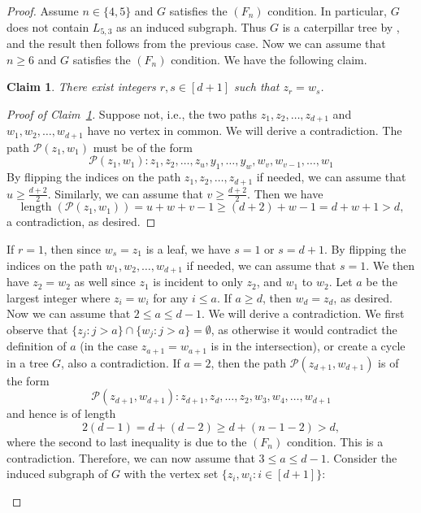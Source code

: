 \documentclass{amsart}
\newtheorem{claim}[theorem]{Claim}
\theoremstyle{remark}
\theoremstyle{definition}
\DeclareMathOperator{\length}{length}
\begin{document}
\begin{proof}
		Assume $n\in \{4,5\}$ and $G$ satisfies the $(F_n)$ condition. In particular, $G$ does not contain $L_{5,3}$ as an induced subgraph. Thus $G$ is a caterpillar tree by \cite[Theorem~1]{HS71}, and the result then follows from the previous case. Now we can assume that $n\geq 6$ and $G$ satisfies the $(F_n)$ condition. We have the following claim.
		\begin{claim}\label{clm:z-w-intersect}
			There exist integers $r,s\in [d+1]$ such that $z_r=w_s$.
		\end{claim}
		\begin{proof}[Proof of Claim~\ref{clm:z-w-intersect}]
			Suppose not, i.e., the two paths $z_1,z_2,\dots, z_{d+1}$ and $w_1,w_2,\dots, w_{d+1}$ have no vertex in common. We will derive a contradiction. The path $\mathcal{P}(z_1,w_1)$ must be of the form
			\[
			\mathcal{P}(z_1,w_1)\colon z_1,z_2, \dots, z_u, y_1,\dots, y_w, w_v,w_{v-1},\dots ,w_1 
			\]
			By flipping the indices on the path $z_1,z_2,\dots, z_{d+1}$ if needed, we can assume that $u\geq \frac{d+2}{2}$. Similarly, we can assume that $v\geq \frac{d+2}{2}$. Then we have
			\[
			\length(\mathcal{P}(z_1,w_1)) = u+w+v-1 \geq (d+2) +w -1 = d+w+1 > d,
			\]
			a contradiction, as desired.
		\end{proof}
		If $r=1$, then since $w_s=z_1$ is a leaf, we have $s=1$ or $s=d+1$. By flipping the indices on the path $w_1,w_2,\dots, w_{d+1}$ if needed, we can assume that $s=1$. We then have $z_2=w_2$ as well since $z_1$ is incident to only $z_2$, and $w_1$ to $w_2$. Let $a$ be the largest integer where $z_i=w_i$ for any $i\leq a$. If $a\geq d$, then $w_d=z_d$, as desired. Now we can assume that $2\leq a\leq d-1$. We will derive a contradiction. We first observe that $\{z_{j}\colon j>a\} \cap \{w_{j}\colon j>a\}=\emptyset$, as otherwise it would contradict the definition of $a$ (in the case $z_{a+1}=w_{a+1}$ is in the intersection), or create a cycle in a tree $G$, also a contradiction. If $a=2$, then the path $\mathcal{P}(z_{d+1},w_{d+1})$ is of the form
		\[
		\mathcal{P}(z_{d+1},w_{d+1})\colon z_{d+1},z_d,\dots, z_2,w_3,w_4,\dots, w_{d+1} 
		\]
		and hence is of length $$2(d-1)=d+(d-2)\geq d+(n-1-2)>d,$$
        where the second to last inequality is due to the $(F_n)$ condition. This is a contradiction. Therefore, we can now assume that $3\leq a\leq d-1$. Consider the induced subgraph of $G$ with the vertex set $\{z_i,w_i\colon i\in [d+1]\}$:
		
		\begin{figure}[H]
			\begin{center}
				\begin{tikzpicture}[every node/.style={circle,draw,inner sep=2pt}, scale=1.5]
					

\end{tikzpicture}
\end{center}
\end{figure}
\end{proof}
\end{document}
